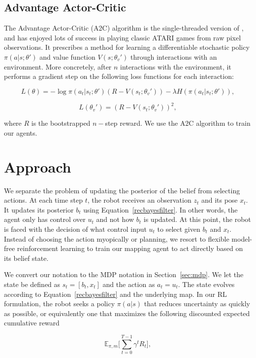 \documentclass{article}
\begin{document}
\subsection{Advantage Actor-Critic}
\label{sec:a2c}

The Advantage Actor-Critic (A2C) algorithm is the single-threaded version of \cite{mnih2016asynchronous}, and has enjoyed lots of success in playing classic ATARI games from raw pixel observations. It prescribes a method for learning a differentiable stochastic policy $\pi(a|s; \theta')$ and value function $V(s; \theta_v')$ through interactions with an environment. More concretely, after $n$ interactions with the environment, it performs a gradient step on the following loss functions for each interaction:

$$L(\theta) = -\log \pi(a_t|s_t; \theta')(R-V(s_t;\theta_v')) - \lambda H(\pi(a_t|s_t; \theta')),$$

$$L(\theta_v') = (R-V(s_t;\theta_v'))^2,$$

where $R$ is the bootstrapped $n-$step reward. We use the A2C algorithm to train our agents.

\section{Approach}

We separate the problem of updating the posterior of the belief from selecting actions. At each time step $t$, the robot receives an observation $z_t$ and its pose $x_t$. It updates its posterior $b_t$ using Equation~\ref{recbayesfilter}. In other words, the agent only has control over $u_t$ and not how $b_t$ is updated. At this point, the robot is faced with the decision of what control input $u_t$ to select given $b_t$ and $x_t$. Instead of choosing the action myopically or planning, we resort to flexible model-free reinforcement learning to train our mapping agent to act directly based on its belief state.

We convert our notation to the MDP notation in Section~\ref{sec:mdp}. We let the state be defined as $s_t=[b_t, x_t]$ and the action as $a_t=u_t$. The state evolves according to Equation~\ref{recbayesfilter} and the underlying map. In our RL formulation, the robot seeks a policy $\pi(a|s)$ that reduces uncertainty as quickly as possible, or equivalently one that maximizes the following discounted expected cumulative reward

$$\mathbb{E}_{\pi, m} \big [ \sum_{t=0}^{T-1} \gamma^t R_t \big ],$$
\end{document}
